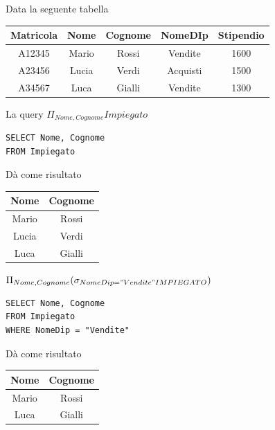\documentclass{article}
\begin{document}
Data la seguente tabella

\begin{table}[h!]
	\centering
\begin{tabular}{|c|c|c|c|c|}
	\hline
	\textbf{Matricola} & \textbf{Nome} & \textbf{Cognome} & \textbf{NomeDIp} & \textbf{Stipendio} \\
	\hline
	A12345 & Mario & Rossi & Vendite & 1600 \\
	\hline
	A23456 & Lucia & Verdi & Acquisti & 1500 \\
	\hline
	A34567 & Luca & Gialli & Vendite & 1300\\
	\hline
\end{tabular}
\end{table}

La query  $\Pi_{Nome,Cognome} Impiegato$

\begin{minipage}{0.45\linewidth}
\begin{lstlisting}[style=sqlstyle]
SELECT Nome, Cognome
FROM Impiegato
\end{lstlisting}
\end{minipage}
\begin{minipage}{0.45\linewidth}
	\hfill
	Dà come risultato \hfill
\begin{tabular}{|c|c|}
	\hline \textbf{Nome} & \textbf{Cognome} \\
	\hline
	Mario & Rossi \\
	\hline
	Lucia & Verdi \\
	\hline
	Luca & Gialli \\
	\hline
\end{tabular}
\end{minipage}

$\Pi_{Nome,Cognome}(\sigma_{NomeDip = "Vendite" IMPIEGATO})$

\begin{minipage}{0.45\linewidth}
\begin{lstlisting}[style=sqlstyle]
SELECT Nome, Cognome
FROM Impiegato
WHERE NomeDip = "Vendite"
\end{lstlisting}
\end{minipage}
\begin{minipage}{0.45\linewidth}
	\hfill
	Dà come risultato \hfill
\begin{tabular}{|c|c|}
	\hline
	\textbf{Nome} & \textbf{Cognome} \\
	\hline
	Mario & Rossi \\
	\hline
	Luca & Gialli \\
	\hline
\end{tabular}
\end{minipage}
\end{document}
